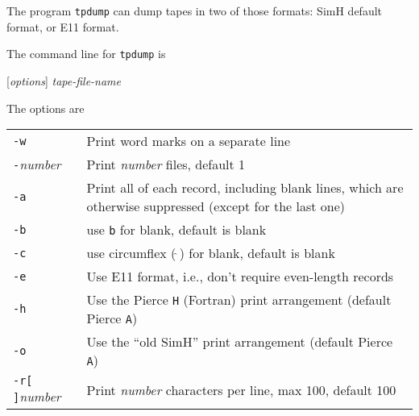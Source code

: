 \documentclass[12pt,twoside]{article}
\begin{document}
The program {\tt tpdump} can dump tapes in two of those formats: SimH
default format, or E11 format.

The command line for {\tt tpdump} is

\hspace*{0.25in}{\tt tpdump} [\emph{options}] \emph{tape-file-name}

The options are \\[0pt]

\begin{longtable}{lp{4.5in}}
{\tt -w}  & Print word marks on a separate line \\
{\tt -}\emph{number} & Print \emph{number} files, default 1 \\
{\tt -a}  & Print all of each record, including blank lines, which are
            otherwise suppressed (except for the last one) \\
{\tt -b}  & use {\tt b} for blank, default is blank \\
{\tt -c}  & use circumflex ({\tt $\hat{\phantom{.}}$}) for blank, default
            is blank \\
{\tt -e}  & Use E11 format, i.e., don't require even-length records \\
{\tt -h}  & Use the Pierce {\tt H} (Fortran) print arrangement (default
            Pierce {\tt A}) \\
{\tt -o}  & Use the ``old SimH'' print arrangement (default Pierce {\tt A}) \\
{\tt -r[ ]}\emph{number} & Print \emph{number} characters per line, max
            100, default 100 \\
\end{longtable}

\label{lastpage}
\end{document}
